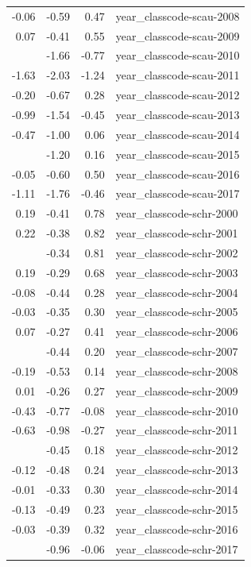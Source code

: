 \documentclass[]{article}
\begin{document}
\begin{longtable}[t]{rrrl}
-0.06 & -0.59 & 0.47 & year\_classcode-scau-2008\\
0.07 & -0.41 & 0.55 & year\_classcode-scau-2009\\
\addlinespace
-1.21 & -1.66 & -0.77 & year\_classcode-scau-2010\\
-1.63 & -2.03 & -1.24 & year\_classcode-scau-2011\\
-0.20 & -0.67 & 0.28 & year\_classcode-scau-2012\\
-0.99 & -1.54 & -0.45 & year\_classcode-scau-2013\\
-0.47 & -1.00 & 0.06 & year\_classcode-scau-2014\\
\addlinespace
-0.52 & -1.20 & 0.16 & year\_classcode-scau-2015\\
-0.05 & -0.60 & 0.50 & year\_classcode-scau-2016\\
-1.11 & -1.76 & -0.46 & year\_classcode-scau-2017\\
0.19 & -0.41 & 0.78 & year\_classcode-schr-2000\\
0.22 & -0.38 & 0.82 & year\_classcode-schr-2001\\
\addlinespace
0.23 & -0.34 & 0.81 & year\_classcode-schr-2002\\
0.19 & -0.29 & 0.68 & year\_classcode-schr-2003\\
-0.08 & -0.44 & 0.28 & year\_classcode-schr-2004\\
-0.03 & -0.35 & 0.30 & year\_classcode-schr-2005\\
0.07 & -0.27 & 0.41 & year\_classcode-schr-2006\\
\addlinespace
-0.12 & -0.44 & 0.20 & year\_classcode-schr-2007\\
-0.19 & -0.53 & 0.14 & year\_classcode-schr-2008\\
0.01 & -0.26 & 0.27 & year\_classcode-schr-2009\\
-0.43 & -0.77 & -0.08 & year\_classcode-schr-2010\\
-0.63 & -0.98 & -0.27 & year\_classcode-schr-2011\\
\addlinespace
-0.14 & -0.45 & 0.18 & year\_classcode-schr-2012\\
-0.12 & -0.48 & 0.24 & year\_classcode-schr-2013\\
-0.01 & -0.33 & 0.30 & year\_classcode-schr-2014\\
-0.13 & -0.49 & 0.23 & year\_classcode-schr-2015\\
-0.03 & -0.39 & 0.32 & year\_classcode-schr-2016\\
\addlinespace
-0.51 & -0.96 & -0.06 & year\_classcode-schr-2017\\

\end{longtable}
\end{document}
